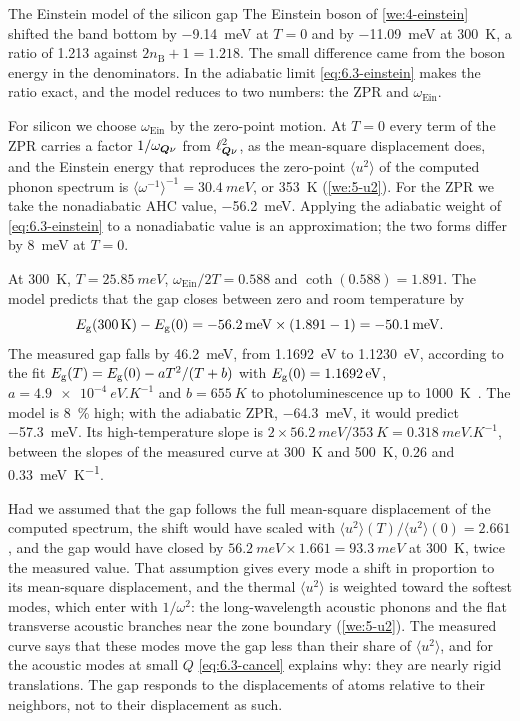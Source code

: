\begin{workedexample}{The Einstein model of the silicon gap}\label{we:6-zpr}
The Einstein boson of \cref{we:4-einstein} shifted the band bottom by \SI{-9.14}{meV} at $T = 0$ and by \SI{-11.09}{meV} at \SI{300}{K}, a ratio of 1.213 against $2n_{\mathrm{B}} + 1 = 1.218$. The small difference came from the boson energy in the denominators. In the adiabatic limit \cref{eq:6.3-einstein} makes the ratio exact, and the model reduces to two numbers: the ZPR and $\omega_{\mathrm{Ein}}$.

For silicon we choose $\omega_{\mathrm{Ein}}$ by the zero-point motion. At $T = 0$ every term of the ZPR carries a factor $1/\omega_{\bm{Q}\nu}$ from $\ell_{\bm{Q}\nu}^2$, as the mean-square displacement does, and the Einstein energy that reproduces the zero-point $\langle u^2\rangle$ of the computed phonon spectrum is $\langle\omega^{-1}\rangle^{-1} = \SI{30.4}{meV}$, or \SI{353}{K} (\cref{we:5-u2}). For the ZPR we take the nonadiabatic AHC value, \SI{-56.2}{meV}. Applying the adiabatic weight of \cref{eq:6.3-einstein} to a nonadiabatic value is an approximation; the two forms differ by \SI{8}{meV} at $T = 0$.

At \SI{300}{K}, $T = \SI{25.85}{meV}$, $\omega_{\mathrm{Ein}}/2T = 0.588$ and $\coth(0.588) = 1.891$. The model predicts that the gap closes between zero and room temperature by
\begin{equation*}
  E_{\mathrm{g}}(\SI{300}{K}) - E_{\mathrm{g}}(0) = -\SI{56.2}{meV}\times(1.891 - 1) = -\SI{50.1}{meV} .
\end{equation*}
The measured gap falls by \SI{46.2}{meV}, from \SI{1.1692}{eV} to \SI{1.1230}{eV}, according to the fit $E_{\mathrm{g}}(T) = E_{\mathrm{g}}(0) - aT^2/(T + b)$ with $E_{\mathrm{g}}(0) = \SI{1.1692}{eV}$, $a = \SI{4.9e-4}{eV.K^{-1}}$ and $b = \SI{655}{K}$ to photoluminescence up to \SI{1000}{K}~\cites{alex1996temperature}[Eq.~(11)]{ramanathan2020ionization}. The model is \SI{8}{\percent} high; with the adiabatic ZPR, \SI{-64.3}{meV}, it would predict \SI{-57.3}{meV}. Its high-temperature slope is $2\times\SI{56.2}{meV}/\SI{353}{K} = \SI{0.318}{meV.K^{-1}}$, between the slopes of the measured curve at \SI{300}{K} and \SI{500}{K}, 0.26 and \SI{0.33}{meV.K^{-1}}.

Had we assumed that the gap follows the full mean-square displacement of the computed spectrum, the shift would have scaled with $\langle u^2\rangle(T)/\langle u^2\rangle(0) = 2.661$, and the gap would have closed by $\SI{56.2}{meV}\times1.661 = \SI{93.3}{meV}$ at \SI{300}{K}, twice the measured value. That assumption gives every mode a shift in proportion to its mean-square displacement, and the thermal $\langle u^2\rangle$ is weighted toward the softest modes, which enter with $1/\omega^2$: the long-wavelength acoustic phonons and the flat transverse acoustic branches near the zone boundary (\cref{we:5-u2}). The measured curve says that these modes move the gap less than their share of $\langle u^2\rangle$, and for the acoustic modes at small $Q$ \cref{eq:6.3-cancel} explains why: they are nearly rigid translations. The gap responds to the displacements of atoms relative to their neighbors, not to their displacement as such.


\end{workedexample}
